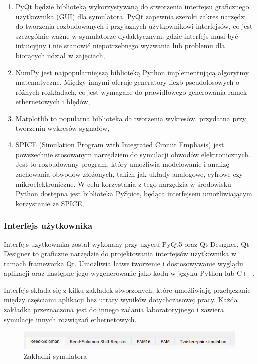 \begin{enumerate}
    \item PyQt będzie biblioteką wykorzystywaną do stworzenia interfejsu graficznego użytkownika (GUI) dla symulatora. PyQt zapewnia szeroki zakres narzędzi do tworzenia rozbudowanych i przyjaznych użytkownikowi interfejsów, co jest szczególnie ważne w symulatorze dydaktycznym, gdzie interfejs musi być intuicyjny i nie stanowić niepotrzebnego wyzwania lub problemu dla biorących udział w zajęciach,
    \item NumPy jest najpopularniejszą biblioteką Python implementującą algorytmy matematyczne. Między innymi oferuje generatory liczb pseudolosowych o różnych rozkładach, co jest wymagane do prawidłowego generowania ramek ethernetowych i błędów,
    \item  Matplotlib to popularna biblioteka do tworzenia wykresów, przydatna przy tworzeniu wykresów sygnałów,
    \item SPICE (Simulation Program with Integrated Circuit Emphasis) jest powszechnie stosowanym narzędziem do symulacji obwodów elektronicznych. Jest to rozbudowany program, który umożliwia modelowanie i analizę zachowania obwodów złożonych, takich jak układy analogowe, cyfrowe czy mikroelektroniczne. W celu korzystania z tego narzędzia w środowisku Python dostępna jest biblioteka PySpice, będąca interfejsem umożliwiającym korzystanie ze SPICE,
\end{enumerate}

\subsubsection{Interfejs użytkownika}
Interfejs użytkownika został wykonany przy użyciu PyQt5 oraz Qt Designer. Qt Designer to graficzne narzędzie do projektowania interfejsów użytkownika w ramach frameworka Qt. Umożliwia łatwe tworzenie i dostosowywanie wyglądu aplikacji oraz następne jego wygenerowanie jako kodu w języku Python lub C++.

Interfejs składa się z kilku zakładek stworzonych, które umożliwiają przełączanie między częściami aplikacji bez utraty wyników dotychczasowej pracy. Każda zakładka przeznaczona jest do innego zadania laboratoryjnego i zawiera symulacje innych rozwiązań ethernetowych.

\begin{figure}[ht]
    \centering
    \includegraphics{images/zakladki.png}
    \caption{Zakładki symulatora}
    \label{fig:zakladki_image}
\end{figure}

